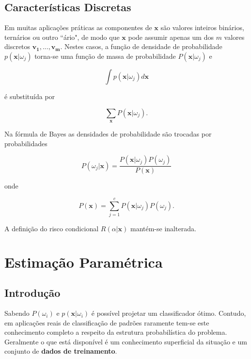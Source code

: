 \documentclass[a4paper,12pt,twocolumn]{article}
\begin{document}
\subsection{Características Discretas}

Em muitas aplicações práticas as componentes de $\boldsymbol{x}$ são valores inteiros binários, ternários ou outro ``ário", de modo que $\boldsymbol{x}$ pode assumir apenas um dos $m$ valores discretos $\boldsymbol{v_1}, ..., \boldsymbol{v_m}$. Nestes casos, a função de densidade de probabilidade $p(\boldsymbol{x}|\omega_j)$ torna-se uma função de massa de probabilidade $P(\boldsymbol{x}|\omega_j)$ e

\begin{equation}
    \int p(\boldsymbol{x}|\omega_j) d\boldsymbol{x}
    \label{eq:integral_pdf}
\end{equation}

\noindent é substituída por

\begin{equation}
    \sum_{\boldsymbol{x}} P(\boldsymbol{x}|\omega_j).
    \label{eq:sum_pmf}
\end{equation}

\noindent Na fórmula de Bayes as densidades de probabilidade são trocadas por probabilidades

\begin{equation}
    P(\omega_j|\boldsymbol{x}) = \frac{P(\boldsymbol{x}|\omega_j)P(\omega_j)}{P(\boldsymbol{x})}
    \label{eq:bayes_discrete}
\end{equation}

onde

\begin{equation}
    P(\boldsymbol{x}) = \sum_{j=1}^c P(\boldsymbol{x}|\omega_j)P(\omega_j).
    \label{eq:bayes_discrete}
\end{equation}

A definição do risco condicional $R(\alpha|\boldsymbol{x})$ mantém-se inalterada.

\section{Estimação Paramétrica}

\subsection{Introdução}

Sabendo $P(\omega_i)$ e $p(\boldsymbol{x}|\omega_i)$ é possível projetar um classificador ótimo. Contudo, em aplicações reais de classificação de padrões raramente tem-se este conhecimento completo a respeito da estrutura probabilística do problema. Geralmente o que está disponível é um conhecimento superficial da situação e um conjunto de \textbf{dados de treinamento}.
\end{document}
